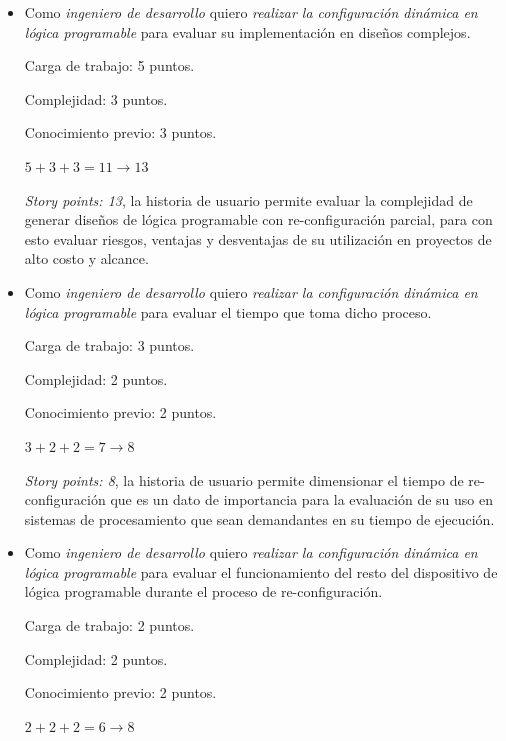 \documentclass[
11pt, %
]{charter}
\begin{document}
\begin{itemize}
	\item Como \emph{ingeniero de desarrollo} quiero \emph{realizar la configuración dinámica en lógica programable} para evaluar su implementación en diseños complejos.
	
	Carga de trabajo: 5 puntos.

	Complejidad: 3 puntos.

	Conocimiento previo: 3 puntos.

	\begin{center}
		$ 5 + 3 + 3 = 11 \rightarrow 13 $
	\end{center}
	 
	\emph{Story points: 13}, la historia de usuario permite evaluar la complejidad de generar diseños de lógica programable con re-configuración parcial, para con esto evaluar riesgos, ventajas y desventajas de su utilización en proyectos de alto costo y alcance.	
	
	\item Como \emph{ingeniero de desarrollo} quiero \emph{realizar la configuración dinámica en lógica programable} para evaluar el tiempo que toma dicho proceso.
			
	Carga de trabajo: 3 puntos.

	Complejidad: 2 puntos.

	Conocimiento previo: 2 puntos.

	\begin{center}
		$ 3 + 2 + 2 = 7 \rightarrow 8 $
	\end{center}
	
	\emph{Story points: 8}, la historia de usuario permite dimensionar el tiempo de re-configuración que es un dato de importancia para la evaluación de su uso en sistemas de procesamiento que sean demandantes en su tiempo de ejecución.

	\item Como \emph{ingeniero de desarrollo} quiero \emph{realizar la configuración dinámica en lógica programable} para evaluar el funcionamiento del resto del dispositivo de lógica programable durante el proceso de re-configuración. 
			
	Carga de trabajo: 2 puntos.

	Complejidad: 2 puntos.

	Conocimiento previo: 2 puntos.

	\begin{center}
		$ 2 + 2 + 2 = 6 \rightarrow 8 $
	\end{center}
	

\end{itemize}
\end{document}
